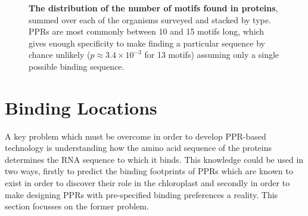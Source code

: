 \begin{figure}
  \begin{center}
    \caption{
      \textbf{The distribution of the number of motifs found in proteins}, 
      summed over each of the organisms surveyed and stacked by type.
      PPRs are most commonly between 10 and 15 motifs long, which gives enough
      specificity to make finding a particular sequence by chance unlikely ($p
      \approx 3.4 \times 10^{-3}$ for 13 motifs) assuming only a single 
      possible binding sequence. 
      \label{fig:ppr_family_lengths}}
  \end{center}
\end{figure}

\section{Binding Locations}

A key problem which must be overcome in order to develop PPR-based technology
is understanding how the amino acid sequence of the proteins determines the RNA
sequence to which it binds.
This knowledge could be used in two ways, firstly to predict the binding
footprints of PPRs which are known to exist in order to discover their role in
the chloroplast and secondly in order to make designing PPRs with pre-specified
binding preferences a reality.
This section focusses on the former problem.

